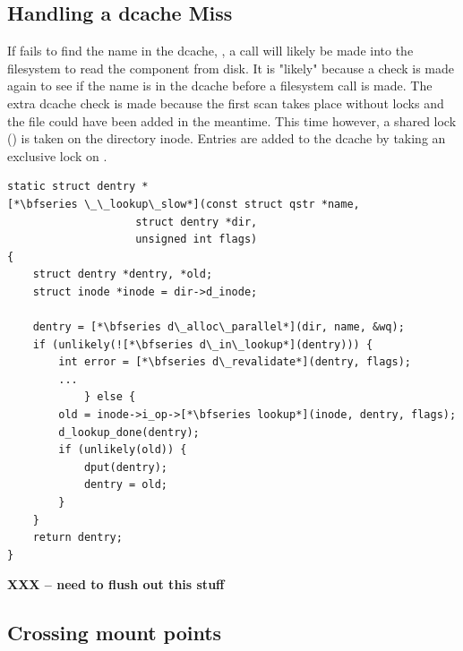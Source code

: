 
\subsection{Handling a dcache Miss}

If  fails to find the name in the dcache, , a call will likely be made into the filesystem to read the component from disk. It is "likely" because a check is made again to see if the name is in the dcache before a  filesystem call is made. The extra dcache check is made because the first scan takes place without locks and the file could have been added in the meantime. This time however, a shared lock () is taken on the directory inode. Entries are added to the dcache by taking an exclusive lock on .

\begin{lstlisting}
static struct dentry *
[*\bfseries \_\_lookup\_slow*](const struct qstr *name,
                    struct dentry *dir,
                    unsigned int flags)
{
    struct dentry *dentry, *old;
    struct inode *inode = dir->d_inode;

    dentry = [*\bfseries d\_alloc\_parallel*](dir, name, &wq);
    if (unlikely(![*\bfseries d\_in\_lookup*](dentry))) {
        int error = [*\bfseries d\_revalidate*](dentry, flags);
        ...
            } else {
        old = inode->i_op->[*\bfseries lookup*](inode, dentry, flags);
        d_lookup_done(dentry);
        if (unlikely(old)) {
            dput(dentry);
            dentry = old;
        }
    }
    return dentry;
}
\end{lstlisting}

\noindent

\textbf{XXX -- need to flush out this stuff}



\subsection{Crossing mount points}

